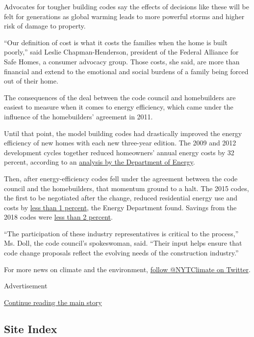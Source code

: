 Advocates for tougher building codes say the effects of decisions like
these will be felt for generations as global warming leads to more
powerful storms and higher risk of damage to property.

``Our definition of cost is what it costs the families when the home is
built poorly,'' said Leslie Chapman-Henderson, president of the Federal
Alliance for Safe Homes, a consumer advocacy group. Those costs, she
said, are more than financial and extend to the emotional and social
burdens of a family being forced out of their home.

The consequences of the deal between the code council and homebuilders
are easiest to measure when it comes to energy efficiency, which came
under the influence of the homebuilders' agreement in 2011.

Until that point, the model building codes had drastically improved the
energy efficiency of new homes with each new three-year edition. The
2009 and 2012 development cycles together reduced homeowners' annual
energy costs by 32 percent, according to an
\href{https://www.energycodes.gov/sites/default/files/documents/NationalResidentialCostEffectiveness.pdf}{analysis
by the Department of Energy}.

Then, after energy-efficiency codes fell under the agreement between the
code council and the homebuilders, that momentum ground to a halt. The
2015 codes, the first to be negotiated after the change, reduced
residential energy use and costs by
\href{https://www.federalregister.gov/documents/2015/06/11/2015-14297/determination-regarding-energy-efficiency-improvements-in-the-2015-international-energy-conservation}{less
than 1 percent}, the Energy Department found. Savings from the 2018
codes were
\href{https://www.energycodes.gov/regulatory/determinations/residential-determination}{less
than 2 percent}.

``The participation of these industry representatives is critical to the
process,'' Ms. Doll, the code council's spokeswoman, said. ``Their input
helps ensure that code change proposals reflect the evolving needs of
the construction industry.''

For more news on climate and the environment,
\href{https://twitter.com/nytclimate}{follow @NYTClimate on Twitter}.

Advertisement

\protect\hyperlink{after-bottom}{Continue reading the main story}

\hypertarget{site-index}{%
\subsection{Site Index}\label{site-index}}

